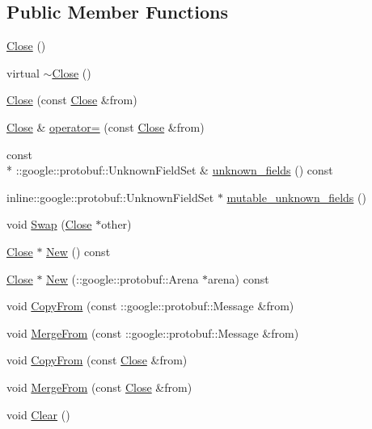 \subsection*{Public Member Functions}
\begin{DoxyCompactItemize}
\item 
\hyperlink{class_close_ad8a0a2858285bd127f5f666bed8dc543}{Close} ()
\item 
virtual \hyperlink{class_close_ae0effd9b2f59fb9f2a6dc87104ef11ea}{$\sim$\-Close} ()
\item 
\hyperlink{class_close_a3cf170e3bce53793243f8459409307b7}{Close} (const \hyperlink{class_close}{Close} \&from)
\item 
\hyperlink{class_close}{Close} \& \hyperlink{class_close_a1b25cdc167aee37d7a8309b04d077bad}{operator=} (const \hyperlink{class_close}{Close} \&from)
\item 
const \\*
\-::google\-::protobuf\-::\-Unknown\-Field\-Set \& \hyperlink{class_close_a5be69c428eb1703c4d80eea28c292d29}{unknown\-\_\-fields} () const 
\item 
inline\-::google\-::protobuf\-::\-Unknown\-Field\-Set $\ast$ \hyperlink{class_close_ae28750281fa411c3c3f8f48caf424ab6}{mutable\-\_\-unknown\-\_\-fields} ()
\item 
void \hyperlink{class_close_aa03838e3abc80695ba93ef7739d7d9fc}{Swap} (\hyperlink{class_close}{Close} $\ast$other)
\item 
\hyperlink{class_close}{Close} $\ast$ \hyperlink{class_close_a863cee284bf4ba2e629e53322e79c218}{New} () const 
\item 
\hyperlink{class_close}{Close} $\ast$ \hyperlink{class_close_a93fd428d5681d636ca918d07e15d6550}{New} (\-::google\-::protobuf\-::\-Arena $\ast$arena) const 
\item 
void \hyperlink{class_close_a8b24eba0bd4d8ee9e6dc879941651748}{Copy\-From} (const \-::google\-::protobuf\-::\-Message \&from)
\item 
void \hyperlink{class_close_a94c8f74312a7d33986d44d5195815d2e}{Merge\-From} (const \-::google\-::protobuf\-::\-Message \&from)
\item 
void \hyperlink{class_close_a104d789ceecc954d91da7df0f107779f}{Copy\-From} (const \hyperlink{class_close}{Close} \&from)
\item 
void \hyperlink{class_close_a37c912bb9f92cdfaa33a7ce8d8ee130e}{Merge\-From} (const \hyperlink{class_close}{Close} \&from)
\item 
void \hyperlink{class_close_afda54c6204c3922e74fc47c60a108220}{Clear} ()

\end{DoxyCompactItemize}
